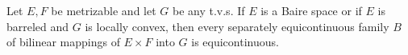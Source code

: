 Let $E, F$ be metrizable and let $G$ be any t.v.s. If $E$ is a Baire space or if $E$ is barreled and $G$ is locally convex, then every separately equicontinuous family $B$ of bilinear mappings of $E \times F$ into $G$ is equicontinuous.
